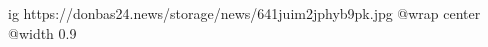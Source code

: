  
 
 
 
 

\ifcmt
  ig https://donbas24.news/storage/news/641juim2jphyb9pk.jpg
  @wrap center
  @width 0.9
\fi
